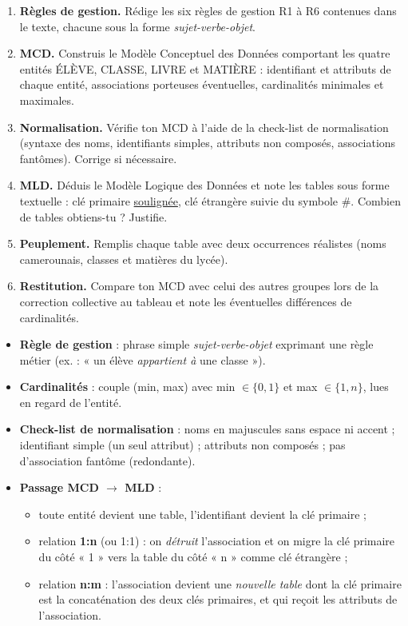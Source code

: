 \documentclass[11pt]{article}
\newcounter{popsec}
\newcounter{popsub}
\newcommand{\courssub}[1]{%
  \stepcounter{popsub}%
  \par\vspace{9pt}\noindent{\popxbold\fontsize{11.5}{13}\selectfont\color{popink}{\color{poporange}\thepopsec.\thepopsub}\hspace{6pt}#1}\par\nopagebreak\vspace{4pt}
}
\begin{document}
\begin{enumerate}
\item \textbf{Règles de gestion.} Rédige les six règles de gestion R1 à R6 contenues dans le texte, chacune sous la forme \emph{sujet-verbe-objet}.
\item \textbf{MCD.} Construis le Modèle Conceptuel des Données comportant les quatre entités ÉLÈVE, CLASSE, LIVRE et MATIÈRE : identifiant et attributs de chaque entité, associations porteuses éventuelles, cardinalités minimales et maximales.
\item \textbf{Normalisation.} Vérifie ton MCD à l'aide de la check-list de normalisation (syntaxe des noms, identifiants simples, attributs non composés, associations fantômes). Corrige si nécessaire.
\item \textbf{MLD.} Déduis le Modèle Logique des Données et note les tables sous forme textuelle : clé primaire \underline{soulignée}, clé étrangère suivie du symbole \#. Combien de tables obtiens-tu ? Justifie.
\item \textbf{Peuplement.} Remplis chaque table avec deux occurrences réalistes (noms camerounais, classes et matières du lycée).
\item \textbf{Restitution.} Compare ton MCD avec celui des autres groupes lors de la correction collective au tableau et note les éventuelles différences de cardinalités.
\end{enumerate}

\courssub{Ressources à mobiliser}

\begin{aretenir}
\begin{itemize}
\item \textbf{Règle de gestion} : phrase simple \emph{sujet-verbe-objet} exprimant une règle métier (ex. : « un élève \emph{appartient à} une classe »).
\item \textbf{Cardinalités} : couple (min, max) avec min $\in \{0,1\}$ et max $\in \{1,n\}$, lues en regard de l'entité.
\item \textbf{Check-list de normalisation} : noms en majuscules sans espace ni accent ; identifiant simple (un seul attribut) ; attributs non composés ; pas d'association fantôme (redondante).
\item \textbf{Passage MCD $\rightarrow$ MLD} :
\begin{itemize}
\item toute entité devient une table, l'identifiant devient la clé primaire ;
\item relation \textbf{1:n} (ou 1:1) : on \emph{détruit} l'association et on migre la clé primaire du côté « 1 » vers la table du côté « n » comme clé étrangère ;
\item relation \textbf{n:m} : l'association devient une \emph{nouvelle table} dont la clé primaire est la concaténation des deux clés primaires, et qui reçoit les attributs de l'association.
\end{itemize}
\end{itemize}
\end{aretenir}
\end{document}
